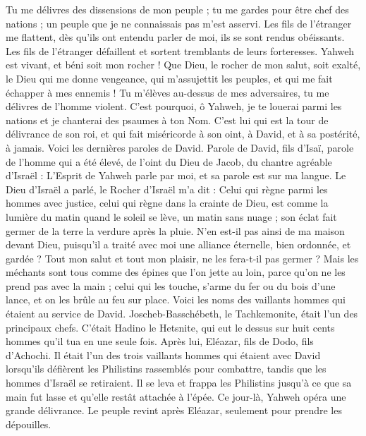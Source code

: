 \begin{multicols}{2}
Tu me délivres des dissensions de mon peuple ; tu me gardes pour être chef des nations ; un peuple que je ne connaissais pas m'est asservi.
Les fils de l'étranger me flattent, dès qu'ils ont entendu parler de moi, ils se sont rendus obéissants.
Les fils de l'étranger défaillent et sortent tremblants de leurs forteresses.
Yahweh est vivant, et béni soit mon rocher ! Que Dieu, le rocher de mon salut, soit exalté,
le Dieu qui me donne vengeance, qui m'assujettit les peuples,
et qui me fait échapper à mes ennemis ! Tu m'élèves au-dessus de mes adversaires, tu me délivres de l'homme violent.
C'est pourquoi, ô Yahweh, je te louerai parmi les nations et je chanterai des psaumes à ton Nom.
C'est lui qui est la tour de délivrance de son roi, et qui fait miséricorde à son oint, à David, et à sa postérité, à jamais.
\VerseOne{}Voici les dernières paroles de David. Parole de David, fils d'Isaï, parole de l'homme qui a été élevé, de l'oint du Dieu de Jacob, du chantre agréable d'Israël :
L'Esprit de Yahweh parle par moi, et sa parole est sur ma langue.
Le Dieu d'Israël a parlé, le Rocher d'Israël m'a dit : Celui qui règne parmi les hommes avec justice, celui qui règne dans la crainte de Dieu,
est comme la lumière du matin quand le soleil se lève, un matin sans nuage ; son éclat fait germer de la terre la verdure après la pluie.
N'en est-il pas ainsi de ma maison devant Dieu, puisqu'il a traité avec moi une alliance éternelle, bien ordonnée, et gardée ? Tout mon salut et tout mon plaisir, ne les fera-t-il pas germer ?
Mais les méchants sont tous comme des épines que l'on jette au loin, parce qu'on ne les prend pas avec la main ;
celui qui les touche, s'arme du fer ou du bois d'une lance, et on les brûle au feu sur place.
Voici les noms des vaillants hommes qui étaient au service de David. Joscheb-Basschébeth, le Tachkemonite, était l'un des principaux chefs. C'était Hadino le Hetsnite, qui eut le dessus sur huit cents hommes qu'il tua en une seule fois.
Après lui, Eléazar, fils de Dodo, fils d'Achochi. Il était l'un des trois vaillants hommes qui étaient avec David lorsqu'ils défièrent les Philistins rassemblés pour combattre, tandis que les hommes d'Israël se retiraient.
Il se leva et frappa les Philistins jusqu'à ce que sa main fut lasse et qu'elle restât attachée à l'épée. Ce jour-là, Yahweh opéra une grande délivrance. Le peuple revint après Eléazar, seulement pour prendre les dépouilles.

\end{multicols}
